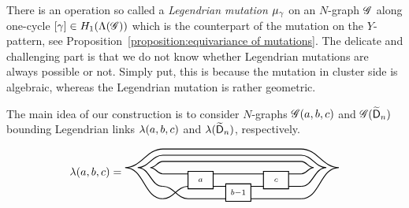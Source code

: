 There is an operation so called a \emph{Legendrian mutation}
$\mu_\gamma$ on an $N$-graph $\mathscr{G}$ along one-cycle $[\gamma]\in
H_1(\Lambda(\mathscr{G}))$ which is the counterpart of the mutation on the
$Y$-pattern, see Proposition~\ref{proposition:equivariance of mutations}. The
delicate and challenging part is that we do not know whether Legendrian
mutations are always possible or not. Simply put, this is because the
mutation in cluster side is algebraic, whereas the Legendrian mutation is
rather geometric.

The main idea of our construction is to consider $N$-graphs $\mathscr{G}(a,b,c)$ and $\mathscr{G}(\widetilde{\mathsf{D}}_n)$ bounding Legendrian links $\lambda(a,b,c)$ and $\lambda(\widetilde{\mathsf{D}}_n)$, respectively.

\begin{align*}
\legendrian(a,b,c)=
\begin{tikzpicture}[baseline=5ex,scale=0.8]
\draw[thick] (0,0) to[out=0,in=180] (1,0.5) (2,0.5) to (2.5,0.5) (3.5,0.5) to (4,0.5) (5,0.5) to (5.5,0.5);
\draw[thick] (0,0.5) to[out=0,in=180] (1,0) to (2.5,0) (3.5,0) to (5.5,0);
\draw[thick] (0,1) to[out=0,in=180] (1,1) (2,1) to (4,1) (5,1) to (5.5,1);
\draw[thick] (1,0.4) rectangle node {$\scriptstyle a$} (2, 1.1);
\draw[thick] (2.5,-0.1) rectangle node {$\scriptstyle{b-1}$} (3.5, 0.6);
\draw[thick] (4,0.4) rectangle node {$\scriptstyle c$} (5, 1.1);
\draw[thick] (0,1) to[out=180, in=0] (-0.5,1.25) to[out=0,in=180] (0,1.5) to (5.5,1.5) to[out=0,in=180] (6,1.25) to[out=180,in=0] (5.5,1);
\draw[thick] (0,0.5) to[out=180, in=0] (-1,1.25) to[out=0,in=180] (0,1.75) to (5.5,1.75) to[out=0,in=180] (6.5,1.25) to[out=180,in=0] (5.5,0.5);
\draw[thick] (0,0) to[out=180, in=0] (-1.5,1.25) to[out=0,in=180] (0,2) to (5.5,2) to[out=0,in=180] (7,1.25) to[out=180,in=0] (5.5,0);
\end{tikzpicture}
\end{align*}

